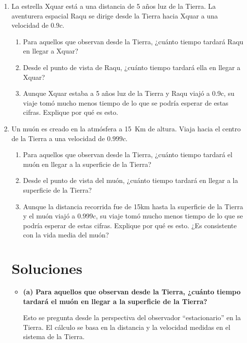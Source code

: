 \documentclass[11pt,a4paper]{book}
\begin{document}
\begin{enumerate}
    
 \item La estrella Xquar está a una distancia de 5 años luz de la
Tierra. La aventurera espacial Raqu se dirige desde la Tierra
hacia Xquar a una velocidad de $0.9c$.
\begin{enumerate}[label=(\alph*)]
    \item Para aquellos que observan desde la Tierra, ¿cuánto tiempo tardará
Raqu en llegar a Xquar?
\item Desde el punto de vista de Raqu, ¿cuánto tiempo tardará ella
en llegar a Xquar?
\item Aunque Xquar estaba a 5 años luz de la Tierra
y Raqu viajó a 0.9c, su viaje tomó mucho
menos tiempo de lo que se podría esperar de estas cifras.
Explique por qué es esto.
\end{enumerate}


\item Un muón es creado en la atmósfera a 15~Km de altura. Viaja hacia el centro de la Tierra a una velocidad de $0.999c$. 
\label{item:muon}

\begin{enumerate}[label=(\alph*)]
    \item Para aquellos que observan desde la Tierra, ¿cuánto tiempo tardará
el muón en llegar a la superficie de la Tierra?
\item Desde el punto de vista del muón, ¿cuánto tiempo tardará
en llegar a la superficie de la Tierra?
\item Aunque la distancia recorrida fue de 15km hasta la superficie de la Tierra y el muón viajó a $0.999c$, 
su viaje tomó mucho
menos tiempo de lo que se podría esperar de estas cifras.
Explique por qué es esto. ¿Es consistente con la vida media del muón?
\end{enumerate}

\section*{Soluciones}

\begin{itemize}
    \item[\ref{item:muon}.]

\textbf{(a) Para aquellos que observan desde la Tierra, ¿cuánto tiempo tardará el muón en llegar a la superficie de la Tierra?}

Esto se pregunta desde la perspectiva del observador ``estacionario'' en la Tierra. El cálculo se basa en la distancia y la velocidad medidas en el sistema de la Tierra.


\end{itemize}
\end{enumerate}
\end{document}

